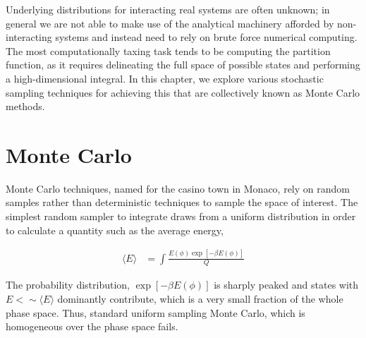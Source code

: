 \documentclass[book.tex]{subfiles}
\begin{document}
Underlying distributions for interacting real systems are often unknown; in general we are not able to make use of the analytical machinery afforded by non-interacting systems and instead need to rely on brute force numerical computing. The most computationally taxing task tends to be computing the partition function, as it requires delineating the full space of possible states and performing a high-dimensional integral.  In this chapter, we explore various stochastic sampling techniques for achieving this that are collectively known as Monte Carlo methods.

\section{Monte Carlo}

Monte Carlo techniques, named for the casino town in Monaco, rely on random samples rather than deterministic techniques to sample the space of interest. The simplest random sampler to integrate draws from a uniform distribution in order to calculate a quantity such as the average energy, 

\begin{align}
\langle E \rangle & = \int \frac{E(\phi) \exp[-\beta E(\phi)]}{Q} 
\end{align} 

The probability distribution, $\exp[-\beta E(\phi)]$ is sharply peaked and states with $E <\sim \langle E \rangle$ dominantly contribute, which is a very small fraction of the whole phase space. Thus, standard uniform sampling Monte Carlo, which is homogeneous over the phase space fails.

\end{document}
